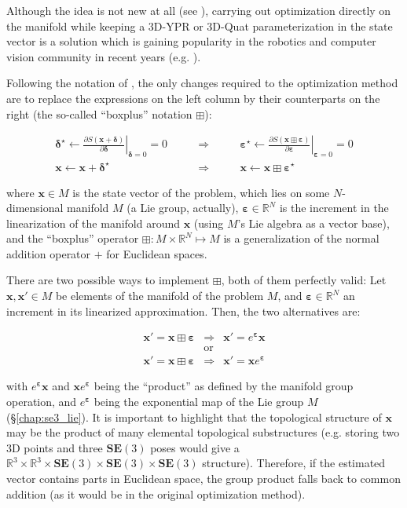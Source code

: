 \documentclass[a4paper,11pt]{report}
\newcommand{\E}{{\bm{\varepsilon}}}
\newcommand{\DEL}{{\bm{\delta}}}
\begin{document}
Although the idea is not new at all (see \cite{gabay1982mdf}),
carrying out optimization directly on the manifold while
keeping a 3D-YPR or 3D-Quat parameterization in the
state vector is a solution which is gaining popularity
in the robotics and computer vision community in recent years
(e.g. \cite{hertzberg2008fsm,strasdat2010scale}).

Following the notation of \cite{hertzberg2008fsm,hertzberg2013integrating}, the only changes required
to the optimization method are
to replace the expressions on the left column by their counterparts on the right (the so-called ``boxplus'' notation $\boxplus$):

\begin{eqnarray}
 \DEL^\star \leftarrow
\left. \frac{\partial S(\mathbf{x} + \DEL )}{\partial \DEL }
\right|_{\DEL=0}  = 0
 &
\quad \quad \Longrightarrow \quad \quad
&
 \E^\star \leftarrow
\left. \frac{\partial S(\mathbf{x} \boxplus {\E} )}{\partial \E }
\right|_{\E=0}  = 0
\\
 \mathbf{x} \leftarrow \mathbf{x} + \DEL^\star
 &
\quad \quad \Longrightarrow \quad \quad
&
 \mathbf{x} \leftarrow \mathbf{x} \boxplus \E^\star
\end{eqnarray}

\noindent where $\mathbf{x} \in M$ is the state vector of the problem, which lies
on some $N$-dimensional manifold $M$ (a Lie group, actually),
$\E \in \mathbb{R}^N$ is the increment in the linearization of the manifold
around $\mathbf{x}$ (using $M$'s Lie algebra as a vector base),
and the ``boxplus'' operator $\boxplus: M \times \mathbb{R}^N \mapsto M$
is a generalization of the normal addition operator $+$ for Euclidean spaces. 

There are two possible ways to implement $\boxplus$, both of them perfectly valid:
Let $\mathbf{x}, \mathbf{x}' \in M$ be elements of the manifold of the problem $M$,
and $\E \in \mathbb{R}^N$ an increment in its linearized approximation.
Then, the two alternatives are:

\begin{eqnarray}
 \mathbf{x}' = \mathbf{x} \boxplus \E  & \Longrightarrow  & \mathbf{x}' = e^\E \mathbf{x}  \\
 & \text{or} & \\
 \mathbf{x}' = \mathbf{x} \boxplus \E  & \Longrightarrow & \mathbf{x}' = \mathbf{x} e^\E 
\end{eqnarray}

\noindent with $e^\E \mathbf{x}$ and $\mathbf{x} e^\E$ being the ``product'' as defined by
the manifold group operation, and $e^\E$ being the exponential map of the Lie group $M$
(\S\ref{chap:se3_lie}).
It is important to highlight that the topological structure of
$\mathbf{x}$ may be the product of many elemental topological substructures
(e.g. storing two 3D points and three $\mathbf{SE}(3)$ poses would give a
$\mathbb{R}^3 \times \mathbb{R}^3 \times \mathbf{SE}(3) \times \mathbf{SE}(3) \times \mathbf{SE}(3)$
structure). Therefore, if the estimated vector contains parts in Euclidean space, the
group product falls back to common addition
(as it would be in the original optimization method).
\end{document}
